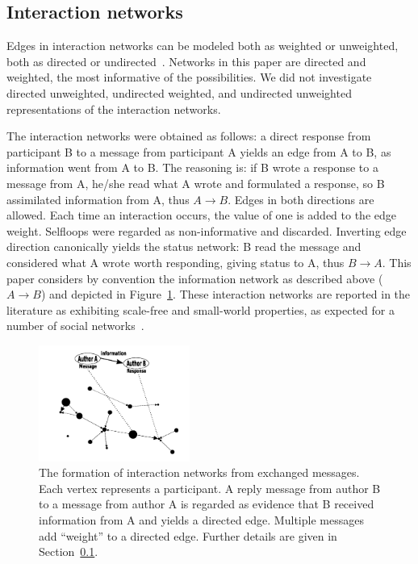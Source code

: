 \documentclass[%
	aip,
	jmp,%
	amsmath,amssymb,
	reprint,%
]{revtex4-1}
\begin{document}
\subsection{Interaction networks}\label{intNet}
Edges in interaction networks can be modeled both as weighted or unweighted,
both as directed or undirected~\cite{bird,newmanCommunityDirected,newmanCommunity2013}.
Networks in this paper are directed and weighted, the most informative of the possibilities.
We did not investigate directed unweighted, undirected weighted,
and undirected unweighted representations of the interaction networks. 

The interaction networks were obtained as follows:
a direct response from participant B to a message from participant A yields an edge from A to B, as information went from A to B.
The reasoning is: if B wrote a response to a message from A,
he/she read what A wrote and formulated a response, so B assimilated information from A, thus $A \rightarrow B$.
Edges in both directions are allowed.
Each time an interaction occurs, the value of one is added to the edge weight.
Selfloops were regarded as non-informative and discarded.
Inverting edge direction canonically yields the status network:
B read the message and considered what A wrote worth responding, giving status to A,
thus $B\rightarrow A$.
This paper considers by convention the information network as described above ($A\rightarrow B$) and depicted in Figure~\ref{formationNetwork}.
These interaction networks are reported in the literature
as exhibiting scale-free and small-world properties,
as expected for a number of social networks~\cite{bird,newmanBook}.

\begin{figure}[!h]
	\centering
	\includegraphics[width=0.44\textwidth]{figs/criaRede2_}
	\caption{The formation of interaction networks from exchanged messages.
	Each vertex represents a participant.
	A reply message from author B to a message from author A is regarded as evidence
	that B received information from A and yields a directed edge.
	Multiple messages add ``weight'' to a directed edge.
	Further details are given in Section~\ref{intNet}.}
	\label{formationNetwork}
\end{figure}
\end{document}
